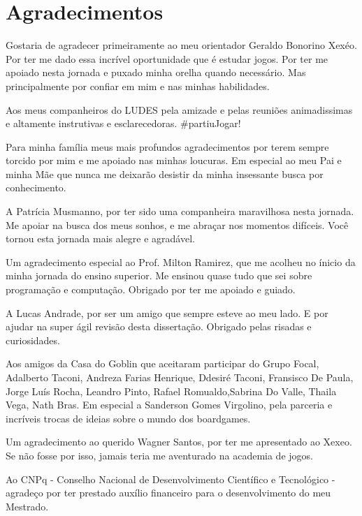 \chapter*{Agradecimentos}

Gostaria de agradecer primeiramente ao meu orientador Geraldo Bonorino Xexéo. Por ter me dado essa incrível oportunidade que é estudar jogos. Por ter me apoiado nesta jornada e puxado minha orelha quando necessário. Mas principalmente por confiar em mim e nas minhas habilidades.

Aos meus companheiros do LUDES pela amizade e pelas reuniões animadissimas e altamente instrutivas e esclarecedoras. \#partiuJogar!

Para minha família meus mais profundos agradecimentos por terem sempre torcido por mim e me apoiado nas minhas loucuras. Em especial ao meu Pai e minha Mãe que nunca me deixarão desistir da minha insessante busca por conhecimento. 

A Patrícia Musmanno, por ter sido uma companheira maravilhosa nesta jornada. Me apoiar na busca dos meus sonhos, e me abraçar nos momentos difíceis. Você tornou esta jornada mais alegre e agradável.

Um agradecimento especial ao Prof. Milton Ramirez, que me acolheu no ínicio da minha jornada do ensino superior. Me ensinou quase tudo que sei sobre programação e computação. Obrigado por ter me apoiado e guiado.

A Lucas Andrade, por ser um amigo que sempre esteve ao meu lado. E por ajudar na super ágil revisão desta dissertação. Obrigado pelas risadas e curiosidades.

Aos amigos da Casa do Goblin que aceitaram participar do Grupo Focal, Adalberto Taconi, Andreza Farias Henrique, Ddesir\'{e} Taconi, Fransisco De Paula, Jorge Lu\'{i}s Rocha, Leandro Pinto, Rafael Romualdo,Sabrina Do Valle, Thaila Vega, Nath Bras. Em especial a Sanderson Gomes Virgolino, pela parceria e incríveis trocas de ideias sobre o mundo dos boardgames.

Um agradecimento ao querido Wagner Santos, por ter me apresentado ao Xexeo. Se não fosse por isso, jamais teria me aventurado na academia de jogos.

Ao CNPq - Conselho Nacional de Desenvolvimento Científico e Tecnológico - agradeço por ter prestado auxílio financeiro para o desenvolvimento do meu Mestrado. 